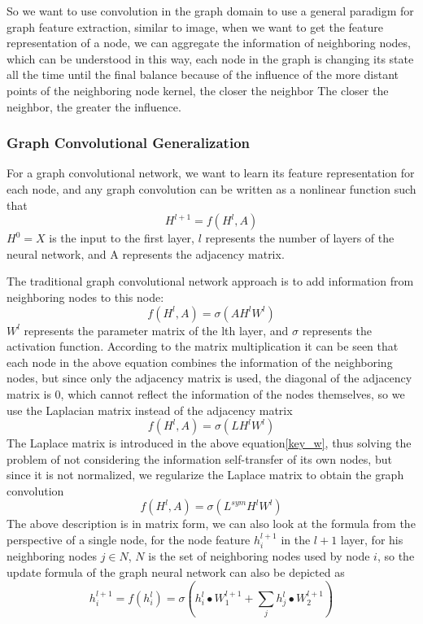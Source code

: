 \documentclass[%
reprint,
amsmath,amssymb,
aps,
]{revtex4-2}
\begin{document}
	So we want to use convolution in the graph domain to use a general paradigm for graph feature extraction, similar to image, when we want to get the feature representation of a node, we can aggregate the information of neighboring nodes, which can be understood in this way, each node in the graph is changing its state all the time until the final balance because of the influence of the more distant points of the neighboring node kernel, the closer the neighbor The closer the neighbor, the greater the influence.
	\subsubsection{Graph Convolutional Generalization}	
	For a graph convolutional network, we want to learn its feature representation for each node, and any graph convolution can be written as a nonlinear function such that
	\begin{equation}\label{key}
		H^{l+1} = f(H^l,A)
	\end{equation}
	$H^0 = X$ is the input to the first layer, $l$ represents the number of layers of the neural network, and A represents the adjacency matrix.

	The traditional graph convolutional network approach is to add information from neighboring nodes to this node:
	\begin{equation}\label{key}
		f(H^l,A) = \sigma(A H^l W^l)
	\end{equation}
	$W^l$ represents the parameter matrix of the lth layer, and $\sigma$ represents the activation function. According to the matrix multiplication it can be seen that each node in the above equation combines the information of the neighboring nodes, but since only the adjacency matrix is used, the diagonal of the adjacency matrix is 0, which cannot reflect the information of the nodes themselves, so we use the Laplacian matrix instead of the adjacency matrix
	\begin{equation}\label{key_w}
		f(H^l,A) = \sigma(L H^l W^l)
	\end{equation}
	The Laplace matrix is introduced in the above equation\eqref{key_w}, thus solving the problem of not considering the information self-transfer of its own nodes, but since it is not normalized, we regularize the Laplace matrix to obtain the graph convolution
	\begin{equation}\label{LapalceMatrix}
	f(H^l,A) = \sigma(L^{sym} H^l W^l)	
	\end{equation}
	The above description is in matrix form, we can also look at the formula from the perspective of a single node, for the node feature $h^{l+1}_i$ in the $l+1$ layer, for his neighboring nodes $j \in N$, $N$ is the set of neighboring nodes used by node $i$, so the update formula of the graph neural network can also be depicted as
	\begin{equation}\label{formulaNode}
		h^{l+1}_i = f(h^{l}_i) = \sigma(h^{l}_i \bullet W_1^{l+1} + \sum_j h^{l}_j \bullet W^{l+1}_2)
	\end{equation}
\end{document}
